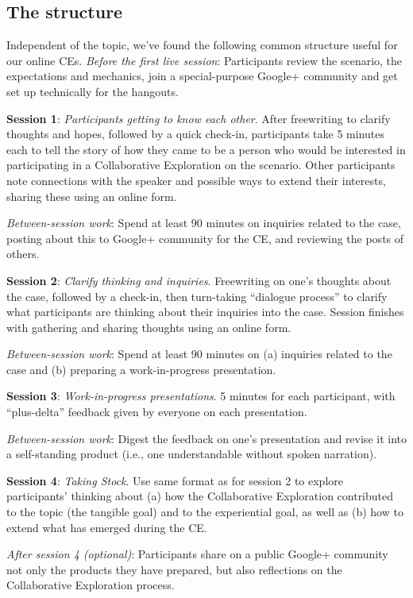 \subsection{The structure}\label{the-structure}

Independent of the topic, we've found the following common structure
useful for our online CEs. \emph{Before the first live session}:
Participants review the scenario, the expectations and mechanics, join a
special-purpose Google+ community and get set up technically for the
hangouts.

\textbf{Session 1}: \emph{Participants getting to know each other}.
After freewriting to clarify thoughts and hopes, followed by a quick
check-in, participants take 5 minutes each to tell the story of how they
came to be a person who would be interested in participating in a
Collaborative Exploration on the scenario. Other participants note
connections with the speaker and possible ways to extend their
interests, sharing these using an online form.

\emph{Between-session work}: Spend at least 90 minutes on inquiries
related to the case, posting about this to Google+ community for the CE,
and reviewing the posts of others.

\textbf{Session 2}: \emph{Clarify thinking and inquiries}. Freewriting
on one's thoughts about the case, followed by a check-in, then
turn-taking ``dialogue process'' to clarify what participants are
thinking about their inquiries into the case. Session finishes with
gathering and sharing thoughts using an online form.

\emph{Between-session work}: Spend at least 90 minutes on (a) inquiries
related to the case and (b) preparing a work-in-progress presentation.

\textbf{Session 3}: \emph{Work-in-progress presentations}. 5 minutes for
each participant, with ``plus-delta'' feedback given by everyone on each
presentation.

\emph{Between-session work}: Digest the feedback on one's presentation
and revise it into a self-standing product (i.e., one understandable
without spoken narration).

\textbf{Session 4}: \emph{Taking Stock}. Use same format as for session
2 to explore participants' thinking about (a) how the Collaborative
Exploration contributed to the topic (the tangible goal) and to the
experiential goal, as well as (b) how to extend what has emerged during
the CE.

\emph{After session 4 (optional)}: Participants share on a public
Google+ community not only the products they have prepared, but also
reflections on the Collaborative Exploration process.

